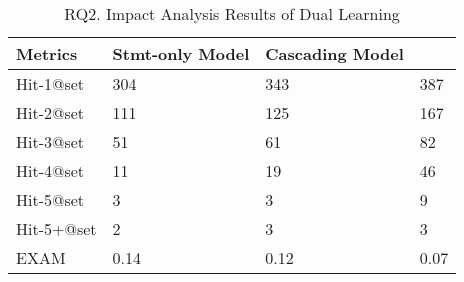 
\begin{table}[t]
	\caption{RQ2. Impact Analysis Results of Dual Learning}
        \vspace{-6pt}
	{\footnotesize
		\begin{center}
			\renewcommand{\arraystretch}{1}
			\begin{tabular}{p{1.35cm}<{\centering}|p{2.1cm}<{\centering}|p{2.1cm}<{\centering}|p{1.2cm}<{\centering}}
				\hline
				Metrics & Stmt-only Model & Cascading Model &  \tool \\			
				\hline
				Hit-1@set   & 304 & 343 & 387 \\
				Hit-2@set	& 111 & 125 & 167\\
				Hit-3@set	& 51 & 61 & 82\\
				Hit-4@set	& 11 & 19 & 46\\
				Hit-5@set	& 3 & 3 & 9\\
				Hit-5+@set	& 2 & 3 & 3\\
				EXAM     	& 0.14 & 0.12 & 0.07\\
				\hline
			\end{tabular}
			
			\label{fig:rq2-1}
		\end{center}
	}
\end{table}
